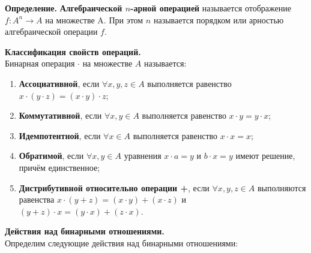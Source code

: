 \documentclass[spec, och, otchet, hidelinks]{SCWorks}
\begin{document}
\par \textbf{Определение.} \textbf{Алгебраической $n$-арной операцией} называется
отображение $f: A^n \rightarrow A$ на множестве A. При этом $n$ называется
порядком или арностью алгебраической операции $f$.

\par \textbf{Классификация свойств операций.} \\
Бинарная операция $\cdot$ на множестве $A$ называется:

\begin{enumerate}
\item \textbf{Ассоциативной}, если $\forall x, y, z \in A$ выполняется
  равенство $x\cdot (y \cdot z) = (x \cdot y) \cdot z$;
\item \textbf{Коммутативной}, если $\forall x, y \in A$ выполняется равенство $x
  \cdot y = y \cdot x$;
\item \textbf{Идемпотентной}, если $\forall x \in A$ выполняется равенство $x
  \cdot x = x$;
\item \textbf{Обратимой}, если $\forall x, y \in A$ уравнения $x \cdot a = y$ и $b
  \cdot x = y$ имеют решение, причём единственное;
\item \textbf{Дистрибутивной относительно операции +}, если $\forall x, y, z \in
  A$ выполняются равенства $ x \cdot (y + z) = (x \cdot y) + (x \cdot z)$ и 
  $(y + z) \cdot x = (y \cdot x) + (z \cdot x)$. \\
\end{enumerate}

\par \textbf{Действия над бинарными отношениями.} \\
Определим следующие действия над бинарными отношениями:
\end{document}
